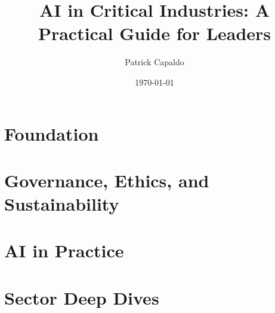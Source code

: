 \documentclass{book}
\title{AI in Critical Industries: A Practical Guide for Leaders}
\author{Patrick Capaldo}
\date{\today}
\begin{document}
\maketitle

\frontmatter
\tableofcontents

\mainmatter



\part{Foundation}



\part{Governance, Ethics, and Sustainability}






\part{AI in Practice}






\part{Sector Deep Dives}









\end{document}
